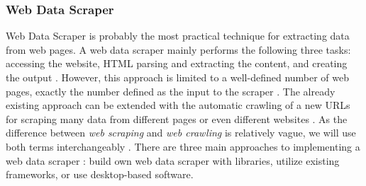 \subsubsection{Web Data Scraper}
Web Data Scraper is probably the most practical technique for extracting data from web pages.
A web data scraper mainly performs the following three tasks: accessing the website, \ac{HTML} parsing and extracting the content, and creating the output \cite{glez2014web}.
However, this approach is limited to a well-defined number of web pages, exactly the number defined as the input to the scraper \cite{vanden2018practical}.
The already existing approach can be extended with the \label{04-crawling} automatic crawling of a new \ac{URL}s for scraping many data from different pages or even different websites \cite{mitchell2018web}.
As the difference between \textit{web scraping} and \textit{web crawling} is relatively vague, we will use both terms interchangeably \cite{vanden2018practical}.
There are three main approaches to implementing a web data scraper \cite{glez2014web}: build own web data scraper with libraries, utilize existing frameworks, or use desktop-based software.
